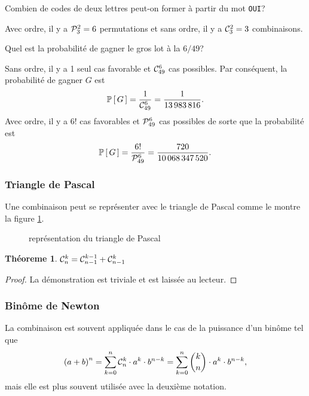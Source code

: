 \documentclass[11pt]{article}
\newcommand\comb[2]{%
	\ensuremath{%
		\mathcal{C}_{#2}^{#1}%
	}%
}%
\newcommand\perm[2]{%
	\ensuremath{%
		\mathcal{P}_{#2}^{#1}%
	}%
}%
\renewcommand\P[1]{%
	\ensuremath{%
		\mathbb{P}\left[\,#1\,\right]%
	}%
}%
\newtheorem{theoreme}{Théoreme}[section]
\theoremstyle{remark}
\theoremstyle{definition}
\begin{document}
\begin{exemple}
	Combien de codes de deux lettres peut-on former à partir du mot
	\texttt{OUI}?
	
	Avec ordre, il y a $\perm{2}{3}=6$ permutations et sans ordre, il y a
	$\comb{2}{3}=3$ combinaisons.
\end{exemple}

\begin{exemple}
	Quel est la probabilité de gagner le gros lot à la $6/49$?
	
	Sans ordre, il y a 1 seul cas favorable et $\comb{6}{49}$ cas possibles.
	Par conséquent, la probabilité de gagner $G$ est
	\begin{equation*}
		\P{G}=\frac{1}{\comb{6}{49}}=\frac{1}{\SI{13983816}{}}.
	\end{equation*}
	Avec ordre, il y a $6!$ cas favorables et $\perm{6}{49}$ cas possibles de
	sorte que la probabilité est
	\begin{equation*}
		\P{G}=\frac{6!}{\perm{6}{49}}=\frac{720}{\SI{10068347520}{}}.
	\end{equation*}
\end{exemple}

\subsubsection{Triangle de Pascal}
Une combinaison peut se représenter avec le triangle de Pascal comme le montre
la figure \ref{fig:pascal}.

\begin{figure}[H]
	\centering
	
	\caption{représentation du triangle de Pascal}
	\label{fig:pascal}
\end{figure}

\begin{theoreme}
	$\comb{k}{n}=\comb{k-1}{n-1}+\comb{k}{n-1}$
\end{theoreme}

\begin{proof}
	La démonstration est triviale et est laissée au lecteur.
\end{proof}

\subsubsection{Binôme de Newton}
La combinaison est souvent appliquée dans le cas de la puissance d'un binôme
tel que
\begin{equation*}
	\left(a+b\right)^n
	=\sum_{k=0}^n\comb{k}{n}\cdot a^k\cdot b^{n-k}
	=\sum_{k=0}^n{{k}\choose{n}}\cdot a^k\cdot b^{n-k},
\end{equation*}
mais elle est plus souvent utilisée avec la deuxième notation.
\end{document}
